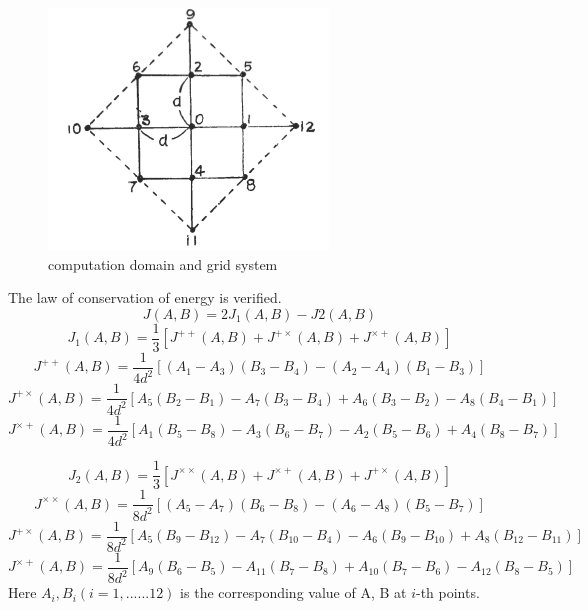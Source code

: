 \documentclass{article}
\begin{document}
\begin{sloppypar}
\begin{figure}
    \centering
    \includegraphics[scale=0.45]{../imgs/wiki/12-points-fd.png}
    \caption{computation domain and grid system}
    \label{fig:1}
\end{figure}
The law of conservation of energy is verified.
\begin{equation}
    J(A, B) = 2J_1(A, B)-J2(A, B)
\end{equation}
\begin{equation}
    J_1(A, B) = \frac{1}{3}[J^{++}(A, B)+J^{+\times}(A, B)+J^{\times+}(A, B)]
\end{equation}
\begin{equation}
    J^{++}(A, B) = \frac{1}{4d^2}[(A_1-A_3)(B_3-B_4)-(A_2-A_4)(B_1-B_3)]
\end{equation}
\begin{equation}
    J^{+\times}(A, B)= \frac{1}{4d^2}[A_5(B_2-B_1)-A_7(B_3-B_4)+A_6(B_3-B_2)-A_8(B_4-B_1)]
\end{equation}
\begin{equation}
    J^{\times+}(A, B) = \frac{1}{4d^2}[A_1(B_5-B_8)-A_3(B_6-B_7)-A_2(B_5-B_6)+A_4(B_8-B_7)]
\end{equation}

\begin{equation}
    J_2(A, B) = \frac{1}{3}[J^{\times\times}(A, B)+J^{\times+}(A, B)+J^{+\times}(A, B)]
\end{equation}
\begin{equation}
    J^{\times\times}(A, B) = \frac{1}{8d^2}[(A_5-A_7)(B_6-B_8)-(A_6-A_8)(B_5-B_7)]
\end{equation}
\begin{equation}
    J^{+\times}(A, B)= \frac{1}{8d^2}[A_5(B_9-B_{12})-A_7(B_{10}-B_4)-A_6(B_9-B_{10})+A_8(B_{12}-B_{11})]
\end{equation}
\begin{equation}
    J^{\times+}(A, B) = \frac{1}{8d^2}[A_9(B_6-B_5)-A_{11}(B_7-B_8)+A_{10}(B_7-B_6)-A_{12}(B_8-B_5)]
\end{equation}
Here $A_i, B_i (i=1,......12)$ is the corresponding value of A, B at $i$-th points.

\end{sloppypar}
\end{document}
